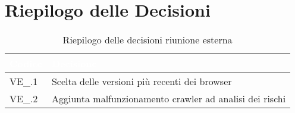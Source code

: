 \section{Riepilogo delle Decisioni}


\begin{table}[!htbp]
\renewcommand{\arraystretch}{1.5}
\begin{tabular}{m{}<{\centering}  m{}<{\centering}}
\rowcolor{darkblue} \textcolor{white}{\textbf{Codice}} & \textcolor{white}{\textbf{Decisione}} \\
\hline
VE\_\D{}.1 &  Scelta delle versioni più recenti dei browser\\
\rowcolor{gray!10} VE\_\D{}.2 &  Aggiunta malfunzionamento crawler ad analisi dei rischi\\

\end{tabular}
\caption{Riepilogo delle decisioni riunione esterna \D{}}
\end{table}